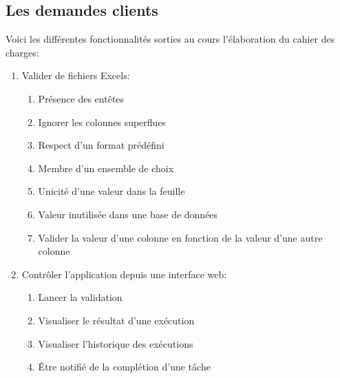 \subsection{Les demandes clients}
\label{subsec:customer-requests}

    Voici les différentes fonctionnalités sorties au cours l'élaboration du cahier des charges:
    \begin{enumerate}
        \item Valider de fichiers Excels:
        \begin{enumerate}
            \item Présence des entêtes
            \item Ignorer les colonnes superflues
            \item Respect d'un format prédéfini
            \item Membre d'un ensemble de choix
            \item Unicité d'une valeur dans la feuille
            \item Valeur inutilisée dans une base de données
            \item Valider la valeur d'une colonne en fonction de la valeur d'une autre colonne
        \end{enumerate}
        \item Contrôler l'application depuis une interface web:
        \begin{enumerate}
            \item Lancer la validation
            \item Visualiser le résultat d'une exécution
            \item Visualiser l'historique des exécutions
            \item Être notifié de la complétion d'une tâche
        \end{enumerate}
    \end{enumerate}
